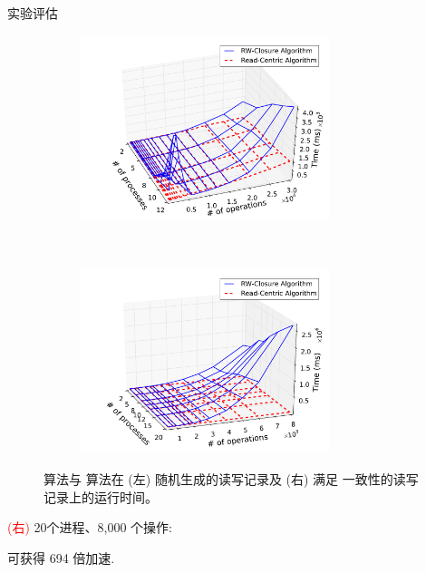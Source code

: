 \begin{frame}{实验评估}
  \begin{figure}[t]
	\centering
	\begin{subfigure}[t]{0.50\textwidth}
	  \includegraphics[width = 0.80\textwidth]{figures/vpc-random-cmp.pdf}
	\end{subfigure}%
	~
	\begin{subfigure}[t]{0.50\textwidth}
	  \includegraphics[width = 0.80\textwidth]{figures/vpc-valid-cmp.pdf}
	\end{subfigure}
	\caption{\rwclosure{} 算法与 \readcentric{} 算法在
	\textcolor{blue!80}{ (左) 随机生成}的读写记录及\textcolor{red!80}{ (右) 
	  满足 \PRAM{} 一致性}的读写记录上的运行时间。}
  \end{figure}

  \pause
  \begin{center}
	\textcolor{red}{(右)} 20个进程、8,000 个操作: 

	\readcentric{} 可获得 694 倍加速.
  \end{center}
\end{frame}
